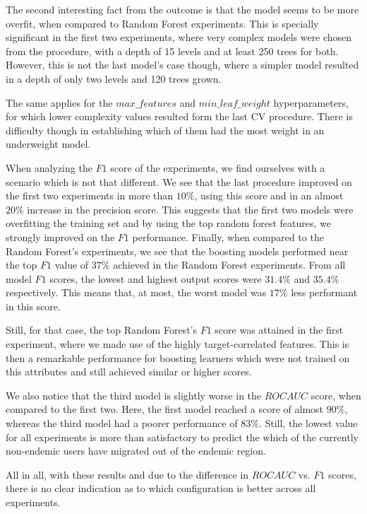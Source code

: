 The second interesting fact from the outcome is that the model seems to be more overfit, when compared to Random Forest experiments.
This is specially significant in the first two experiments, where very complex models were chosen from the procedure, with a depth of 15 levels and at least 250 trees for both.
However, this is not the last model's case though, where a simpler model resulted in a depth of only two levels and 120 trees grown.

The same applies for the $max\_features$ and $min\_leaf\_weight$ hyperparameters, for which lower complexity values resulted form the last CV procedure.
There is difficulty though in establishing which of them had the most weight in an underweight model.

When analyzing the $F1$ score of the experiments, we find ourselves with a scenario which is not that different.
We see that the last procedure improved on the first two experiments in more than $10\%$, using this score and in an almost $20\%$ increase in the precision score.
This suggests that the first two models were overfitting the training set and by using the top random forest features, we strongly improved on the $F1$ performance.
Finally, when compared to the Random Forest's experiments, we see that the boosting models performed near the top $F1$ value of $37\%$ achieved in the Random Forest experiments.
From all model $F1$ scores, the lowest and highest output scores were $31.4\%$ and $35.4\%$ respectively. 
This means that, at most, the worst model was $17\%$ less performant in this score.

Still, for that case, the top Random Forest's $F1$ score was attained in the first experiment, where we made use of the highly target-correlated features.
This is then a remarkable performance for boosting learners which were not trained on this attributes and still achieved similar or higher scores.

We also notice that the third model is slightly worse in  the $ROC AUC$ score, when compared to the first two.
Here, the first model reached a score of almost $90\%$, whereas the third model had a poorer performance of $83\%$.
Still, the lowest value for all experiments is more than satisfactory to predict the which of the currently non-endemic users have migrated out of the endemic region.

All in all, with these results and due to the difference in $ROC AUC$ vs. $F1$ scores, there is no clear indication as to which configuration is better across all experiments.

